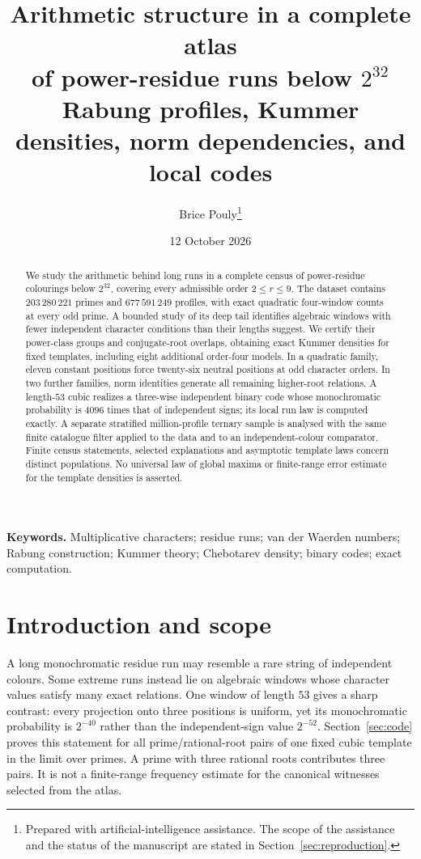 \documentclass[11pt]{article}
\title{Arithmetic structure in a complete atlas\\
of power-residue runs below $2^{32}$\\[3pt]
\large Rabung profiles, Kummer densities, norm dependencies, and local codes}
\author{Brice Pouly\thanks{Prepared with artificial-intelligence assistance. The scope of the assistance and the status of the manuscript are stated in Section~\ref{sec:reproduction}.}}
\date{12 October 2026}
\theoremstyle{definition}\newtheorem{definition}[theorem]{Definition}
\begin{document}
\maketitle
\begin{abstract}
We study the arithmetic behind long runs in a complete census of
power-residue colourings below $2^{32}$, covering every admissible order
$2\le r\le9$. The dataset contains $203\,280\,221$ primes and
$677\,591\,249$ profiles, with exact quadratic four-window counts at every
odd prime. A bounded study of its deep tail identifies algebraic windows
with fewer independent character conditions than their lengths suggest.
We certify their power-class groups and conjugate-root overlaps, obtaining
exact Kummer densities for fixed templates, including eight additional
order-four models. In a quadratic family, eleven constant positions force
twenty-six neutral positions at odd character orders. In two further
families, norm identities generate all remaining higher-root relations.
A length-$53$ cubic realizes a three-wise independent binary code whose
monochromatic probability is $4096$ times that of independent signs;
its local run law is computed exactly. A separate stratified million-profile
ternary sample is analysed with the same finite catalogue filter applied
to the data and to an independent-colour comparator. Finite census
statements, selected explanations and asymptotic template laws concern
distinct populations. No universal law of global maxima or finite-range
error estimate for the template densities is asserted.
\end{abstract}
\noindent\textbf{Keywords.} Multiplicative characters; residue runs;
van der Waerden numbers; Rabung construction; Kummer theory; Chebotarev
density; binary codes; exact computation.

\section{Introduction and scope}
A long monochromatic residue run may resemble a rare string of independent
colours. Some extreme runs instead lie on algebraic windows whose character
values satisfy many exact relations. One window of length $53$ gives a
sharp contrast: every projection onto three positions is uniform, yet its
monochromatic probability is $2^{-40}$ rather than the independent-sign
value $2^{-52}$. Section~\ref{sec:code} proves this statement for all
prime/rational-root pairs of one fixed cubic template in the limit over
primes. A prime with three rational roots contributes three pairs. It is
not a finite-range frequency estimate for the canonical witnesses selected
from the atlas.
\end{document}
